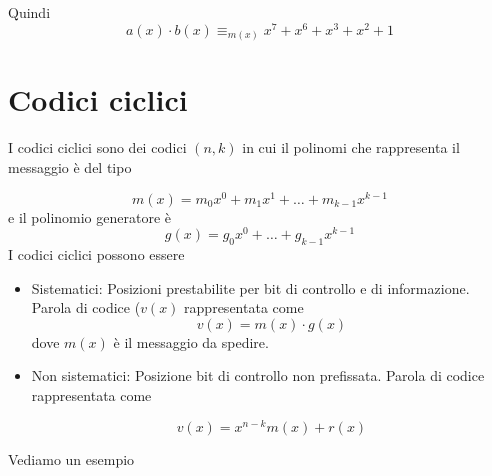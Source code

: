 \documentclass[12pt]{report}
\begin{document}
\begin{exmp}
        \noindent
        Quindi
        $$a(x) \cdot b(x) \equiv_{m(x)} x^7 + x^6 + x^3 + x^2 + 1$$
        \begin{center}
        \end{center}
    \end{exmp}

    \section{Codici ciclici}

    \begin{center}

    \end{center}

    \noindent
    I codici ciclici sono dei codici $(n,k)$ in cui il polinomi che rappresenta il messaggio è del tipo

    $$m(x) = m_0 x^0 + m_1 x^1 + \dots + m_{k-1} x^{k-1}$$
    e il polinomio generatore è
    $$g(x) = g_0 x^0 + \dots + g_{k-1} x^{k-1}$$
    I codici ciclici possono essere

    \begin{itemize}
        \item Sistematici: Posizioni prestabilite per bit di controllo e di informazione. Parola di codice ($v(x)$ rappresentata come
        $$v(x) = m(x) \cdot g(x)$$
        dove $m(x)$ è il messaggio da spedire.
        \item Non sistematici: Posizione bit di controllo non prefissata. Parola di codice rappresentata come

        $$v(x) = x^{n-k} m(x) + r(x)$$
    \end{itemize}
    Vediamo un esempio
\end{document}
